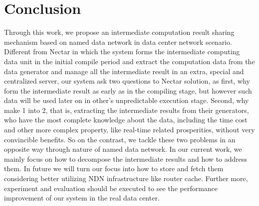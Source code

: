 \section{Conclusion}
Through this work, we propose an intermediate computation result sharing mechanism based on named data network in data center network scenario. Different from Nectar in which the system forms the intermediate computing data unit in the initial compile period and extract the computation data from the data generator and manage all the intermediate result in an extra, special and centralized server, our system ask two questions to Nectar solution, as first, why form the intermediate result as early as in the compiling stage, but however such data will be used later on in other’s unpredictable execution stage. Second, why make 1 into 2, that is, extracting the intermediate results from their generators, who have the most complete knowledge about the data, including the time cost and other more complex property, like real-time related prosperities, without very convincible benefits. So on the contrast, we tackle these two problems in an opposite way through nature of named data network. In our current work, we mainly focus on how to decompose the intermediate results and how to address them. In future we will turn our focus into how to store and fetch them considering better utilizing NDN infrastructure like router cache. Further more, experiment and evaluation should be executed to see the performance improvement of our system in the real data center.
